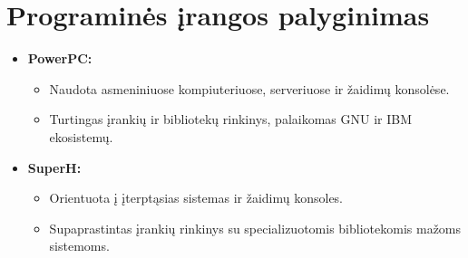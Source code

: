 \documentclass{article}
\begin{document}
\section*{Programinės įrangos palyginimas}
\begin{itemize}
    \item \textbf{PowerPC:}
        \begin{itemize}
            \item Naudota asmeniniuose kompiuteriuose, serveriuose ir žaidimų konsolėse.
            \item Turtingas įrankių ir bibliotekų rinkinys, palaikomas GNU ir IBM ekosistemų.
        \end{itemize}
    \item \textbf{SuperH:}
        \begin{itemize}
            \item Orientuota į įterptąsias sistemas ir žaidimų konsoles.
            \item Supaprastintas įrankių rinkinys su specializuotomis bibliotekomis mažoms sistemoms.
        \end{itemize}
\end{itemize}


 
\end{document}
